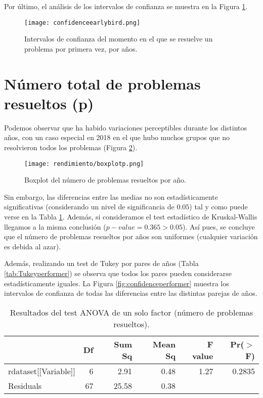 Por último, el análisis de los intervalos de confianza se muestra en la Figura \ref{fig:confidenceearlybird}.

\begin{figure}[H]
    \centering
    \texttt{[image: confidenceearlybird.png]}
    \caption{Intervalos de confianza del momento en el que se resuelve un problema por primera vez, por años.}
    \label{fig:confidenceearlybird}
\end{figure}

\section{Número total de problemas resueltos (p)}

Podemos observar que ha habido variaciones perceptibles durante los distintos años, con un caso especial en 2018 en el que hubo muchos grupos que no resolvieron todos los problemas (Figura \ref{fig:boxplotperformer}).

\begin{figure}[H]
    \centering
    \texttt{[image: rendimiento/boxplotp.png]}
    \caption{Boxplot del número de problemas resueltos por año.}
    \label{fig:boxplotperformer}
\end{figure}

Sin embargo, las diferencias entre las medias no son estadísticamente significativas (considerando un nivel de significancia de $0.05$) tal y como puede verse en la Tabla \ref{tab:ANOVAperformer}. Además, si consideramos el test estadístico de Kruskal-Wallis llegamos a la misma conclusión ($p-value = 0.365 > 0.05$). Así pues, se concluye que el número de problemas resueltos por años son uniformes (cualquier variación es debida al azar).

Además, realizando un test de Tukey por pares de años (Tabla \ref{tab:Tukeyperformer}) se observa que todos los pares pueden considerarse estadísticamente iguales. La Figura \ref{fig:confidenceperformer} muestra los intervalos de confianza de todas las diferencias entre las distintas parejas de años.

\begin{table}[H]
\centering
\caption{Resultados del test ANOVA de un solo factor (número de problemas resueltos).}
\label{tab:ANOVAperformer}
\begin{tabular}{lrrrrr}
  \hline
 & Df & Sum Sq & Mean Sq & F value & Pr($>$F) \\ 
  \hline
rdataset[[Variable]] & 6 & 2.91 & 0.48 & 1.27 & 0.2835 \\ 
  Residuals            & 67 & 25.58 & 0.38 &  &  \\ 
   \hline
\end{tabular}
\end{table}


